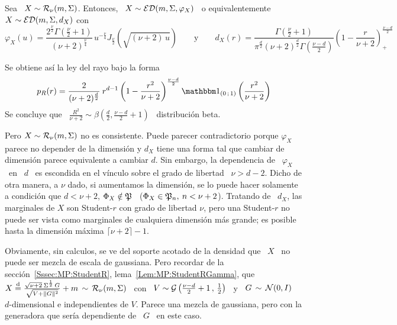 \begin{ejemplo}
%
  Sea \ $X \sim \mathcal{R}_\nu(m,\Sigma)$.  Entonces, \ $X \sim \mathcal{ED}(m,\Sigma,\varphi_X)$
  \ o equivalentemente \ $X \sim \mathcal{ED}(m,\Sigma,d_X)$ con
  \[
  \varphi_X(u)   =   \frac{2^{\frac{\nu}{2}}   \Gamma\left(   \frac{\nu}{2}   +1
    \right)}{(\nu+2)^{\frac{\nu}{4}}}            \,           u^{-\frac{\nu}{4}}
  J_{\frac{\nu}{2}}\left(  \sqrt{(\nu+2) \,  u} \right)  \qquad  \mbox{y} \qquad
  d_X(r)  =  \frac{\Gamma\left(  \frac{\nu}{2}  +  1  \right)}{\pi^{\frac{d}{2}}
    (\nu+2)^{\frac{d}{2}}  \Gamma\left(  \frac{\nu-d}{2}  \right)}  \left(  1  -
    \frac{r}{\nu+2} \right)_+^{\frac{\nu-d}{2}}
  \]
  
  Se obtiene as\'i la ley del rayo bajo la forma
  \[
  p_R(r)   =    \frac{2}{(\nu+2)^{\frac{d}{2}}}   \:   r^{d-1}    \left(   1   -
    \frac{r^2}{\nu+2}    \right)^{\frac{\nu-d}{2}}    \un_{(0    \;    1)}\left(
    \frac{r^2}{\nu+2} \right)
  \]
  Se  concluye   que  \   $\frac{R^2}{\nu+2}  \sim  \beta\left(   \frac{d}{2}  ,
    \frac{\nu-d}{2}+1 \right)$ \ distribuci\'on beta.

  Pero $X \sim \mathcal{R}_\nu(m,\Sigma)$ no es consistente. Puede parecer contradictorio
  porque  $\varphi_X$ parece no  depender de  la dimensi\'on  y $d_X$  tiene una
  forma tal  que cambiar  de dimensi\'on parece  equivalente a cambiar  $d$. Sin
  embargo, la  dependencia de  \ $\varphi_X$  \ en \  $d$ \  es escondida  en el
  v\'inculo sobre el  grado de libertad \  $\nu > d-2$. Dicho de  otra manera, a
  $\nu$  dado, si  aumentamos  la dimensi\'on,  se  lo puede  hacer solamente  a
  condici\'on que $d < \nu+2$, \ie $\Phi_X \notin \mathfrak{P}$ \ ($\Phi_X \in \mathfrak{P}_n, \:
  n < \nu+2$).   Tratando de \ $d_X$, las marginales de  $X$ son Student-$r$ con
  grado  de  libertad  $\nu$, pero  una  Student-$r$  no  puede ser  vista  como
  marginales  de  cualquiera  dimensi\'on  m\'as  grande;  es  posible  hasta  la
  dimensi\'on m\'axima $\lceil \nu+2 \rceil-1$.

  Obviamente, sin calculos, se ve del soporte acotado de la densidad que \ $X$ \
  no  puede   ser  mezcla  de  escala   de  gaussiana.   Pero   recordar  de  la
  secci\'on~\ref{Sssec:MP:StudentR},  lema~\ref{Lem:MP:StudentRGamma}, que  \ $X
  \stackrel{\mathrm{d}}{=} \frac{\sqrt{\nu+2} \: \Sigma^{\frac12} \, G}{\sqrt{V + \|G\|^2}} + m \,
  \sim \, \mathcal{R}_\nu( m , \Sigma )$  \ con \ $V \sim \mathcal{G}\left( \frac{\nu-d}{2}+1 \, ,
    \,  \frac12 \right)$  \  y \  $G \,  \sim  \, \mathcal{N}(0,I)$  \ $d$-dimensional  e
  independientes de $V$.  Parece una mezcla de gaussiana, pero con la generadora
  que ser\'ia dependiente de \ $G$ \ en este caso.
\end{ejemplo}

